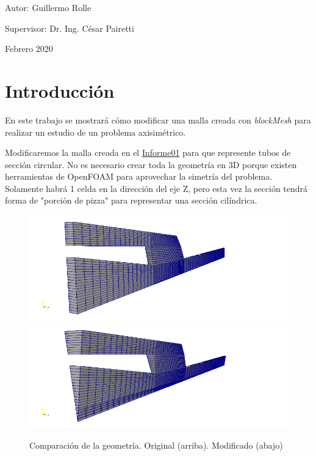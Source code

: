 \documentclass{article}
\begin{document}
\begin{titlepage}
\begin{center}
    \bigskip
    \vspace*{\fill}
    Autor: Guillermo Rolle\par
    Supervisor: Dr. Ing. César Pairetti\par
    \bigskip
    Febrero 2020
\end{center}
\end{titlepage}

\tableofcontents
\newpage

\section{Introducción}
En este trabajo se mostrará cómo modificar una malla creada con \textit{blockMesh} para realizar un estudio de un problema axisimétrico.\par
Modificaremos la malla creada en el \href{https://github.com/guillerolle/informes_cfd/blob/master/Informe01.pdf}{Informe01} para que represente tubos de sección circular. No es necesario crear toda la geometría en 3D porque existen herramientas de OpenFOAM para aprovechar la simetría del problema. Solamente habrá 1 celda en la dirección del eje Z, pero esta vez la sección tendrá forma de "porción de pizza" para representar una sección cilíndrica.

\begin{figure}[h!]
	\centering
	\includegraphics[width=1\textwidth]{Figuras/01_comp_01.png}
	\includegraphics[width=1\textwidth]{Figuras/01_comp_02.png}
	\caption{Comparación de la geometría. Original (arriba). Modificado (abajo)}
	\label{fig:preliminar}
\end{figure}
\end{document}

